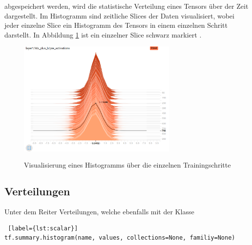 abgespeichert werden, wird die statistische Verteilung eines Tensors über der Zeit dargestellt. Im Histogramm sind zeitliche \dq Slices\grqq{} der Daten visualisiert, wobei jeder einzelne Slice ein Histogramm des Tensors in einem einzelnen Schritt darstellt. In Abbildung \ref{fig:histogram} ist ein einzelner Slice schwarz markiert \cite{tensorboard.2017}.

\vspace{0.6cm}
\begin{figure}[h!]
	\centering
	 \includegraphics[width=0.7\textwidth]{images/Kapitel_3/histogram.png}\\
	\vspace{10pt} 
	\caption[Visualisierung eines Histogramms über die einzelnen Trainingsschritte]{Visualisierung eines Histogramms über die einzelnen Trainingschritte}
	\label{fig:histogram}
\end{figure}






\subsection{Verteilungen}
\vspace{10pt}

Unter dem Reiter Verteilungen, welche ebenfalls mit der Klasse
\\

\begin{minipage}{\linewidth}
\begin{lstlisting} [label={lst:scalar}]
tf.summary.histogram(name, values, collections=None, familiy=None)
\end{lstlisting}
\end{minipage}
\vspace{0.2cm}

